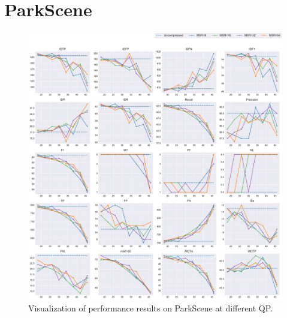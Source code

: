 
\section{ParkScene}
\label{sec:appendix/ParkScene_all}


\begin{figure}[!htbp]
\centering
\includegraphics[width=1.0\linewidth]{img/appendix/ParkScene_all_multiplots_qp.pdf}
\caption[Visualization of performance results on ParkScene at different QP]
{Visualization of performance results on ParkScene at different QP.}
\label{fig:ParkScene_all_qp}
\end{figure}

